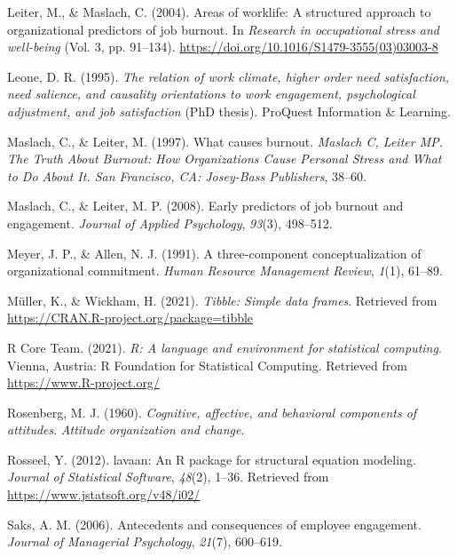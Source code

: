 \documentclass[
  english,
  man]{apa6}
\begin{document}
\leavevmode\hypertarget{ref-leiter_areas_2004}{}%
Leiter, M., \& Maslach, C. (2004). Areas of worklife: A structured approach to organizational predictors of job burnout. In \emph{Research in occupational stress and well-being} (Vol. 3, pp. 91--134). \url{https://doi.org/10.1016/S1479-3555(03)03003-8}

\leavevmode\hypertarget{ref-leone_relation_1995}{}%
Leone, D. R. (1995). \emph{The relation of work climate, higher order need satisfaction, need salience, and causality orientations to work engagement, psychological adjustment, and job satisfaction} (PhD thesis). ProQuest Information \& Learning.

\leavevmode\hypertarget{ref-maslach1997causes}{}%
Maslach, C., \& Leiter, M. (1997). What causes burnout. \emph{Maslach C, Leiter MP. The Truth About Burnout: How Organizations Cause Personal Stress and What to Do About It. San Francisco, CA: Josey-Bass Publishers}, 38--60.

\leavevmode\hypertarget{ref-maslach_early_2008}{}%
Maslach, C., \& Leiter, M. P. (2008). Early predictors of job burnout and engagement. \emph{Journal of Applied Psychology}, \emph{93}(3), 498--512.

\leavevmode\hypertarget{ref-meyer_three-component_1991}{}%
Meyer, J. P., \& Allen, N. J. (1991). A three-component conceptualization of organizational commitment. \emph{Human Resource Management Review}, \emph{1}(1), 61--89.

\leavevmode\hypertarget{ref-R-tibble}{}%
Müller, K., \& Wickham, H. (2021). \emph{Tibble: Simple data frames}. Retrieved from \url{https://CRAN.R-project.org/package=tibble}

\leavevmode\hypertarget{ref-R-base}{}%
R Core Team. (2021). \emph{R: A language and environment for statistical computing}. Vienna, Austria: R Foundation for Statistical Computing. Retrieved from \url{https://www.R-project.org/}

\leavevmode\hypertarget{ref-rosenberg_cognitive_1960}{}%
Rosenberg, M. J. (1960). \emph{Cognitive, affective, and behavioral components of attitudes}. \emph{Attitude organization and change}.

\leavevmode\hypertarget{ref-R-lavaan}{}%
Rosseel, Y. (2012). lavaan: An R package for structural equation modeling. \emph{Journal of Statistical Software}, \emph{48}(2), 1--36. Retrieved from \url{https://www.jstatsoft.org/v48/i02/}

\leavevmode\hypertarget{ref-saks2006antecedents}{}%
Saks, A. M. (2006). Antecedents and consequences of employee engagement. \emph{Journal of Managerial Psychology}, \emph{21}(7), 600--619.
\end{document}
